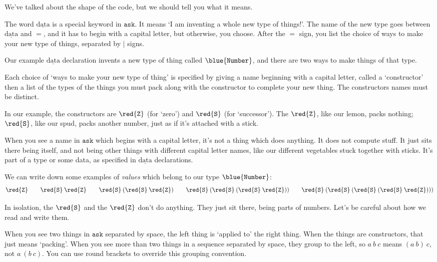 \documentclass{book}
\newcommand{\D}[1]{\blue{\mathtt{#1}}}
\newcommand{\C}[1]{\red{\mathtt{#1}}}
\newcommand{\K}[1]{\underline{\mathrm{#1}}}
\newcommand{\ask}{\mathtt{ask}}
\newcommand{\Number}{\D{Number}}
\newcommand{\Ze}{\C{Z}}
\newcommand{\Su}{\C{S}}
\begin{document}
We've talked about the shape of the code, but we should tell you what it means.

\begin{askism}
  The word $\K{data}$ is a special keyword in $\ask$. It means `I am inventing a whole new type of things!'. The name of the new type goes between $\K{data}$ and $=$, and it has to begin with a capital letter, but otherwise, you choose. After the $=$ sign, you list the choice of ways to make your new type of things, separated by $|$ signs.
\end{askism}

Our example $\K{data}$ declaration invents a new type of thing called $\Number$, and there are two ways to make things of that type.

\begin{askism}
Each choice of `ways to make your new type of thing' is specified by giving a name beginning with a capital letter, called a `constructor' then a list of the types of the things you must pack along with the constructor to complete your new thing. The constructors names must be distinct.
\end{askism}

In our example, the constructors are $\Ze$ (for `zero') and $\Su$ (for `successor'). The $\Ze$, like our lemon, packs nothing; $\Su$, like our spud, packs another number, just as if it's attached with a stick.

\begin{askism}
  When you see a name in $\ask$ which begins with a capital letter, it's not a thing which does anything. It does not compute stuff. It just sits there being itself, and not being other things with different capital letter names, like our different vegetables stuck together with sticks. It's part of a type or some data, as specified in $\K{data}$ declarations.
\end{askism}

We can write down some examples of \emph{values} which belong to our type $\Number$:
\[
\Ze\qquad \Su\:\Ze\qquad \Su\:(\Su\:\Ze)\qquad \Su\:(\Su\:(\Su\:\Ze))
\qquad \Su\:(\Su\:(\Su\:(\Su\:\Ze)))
\]

In isolation, the $\Su$ and the $\Ze$ don't do anything. They just sit there, being parts of numbers. Let's be careful about how we read and write them.

\begin{askism}
  When you see two things in $\ask$ separated by space, the left thing is `applied to' the right thing. When the things are constructors, that just means `packing'. When you see more than two things in a sequence separated by space, they group to the left, so $a\:b\:c$ means $(a\:b)\:c$, not $a\:(b\:c)$. You can use round brackets to override this grouping convention.
\end{askism}
\end{document}
